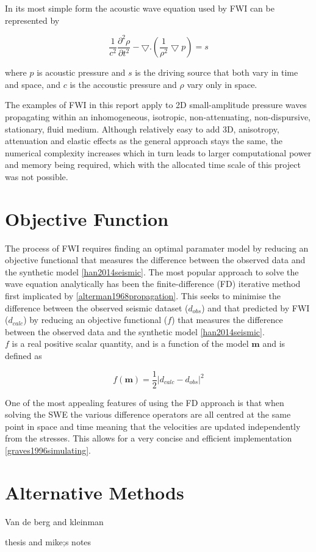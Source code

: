 In its most simple form the acoustic wave equation used by FWI can be represented by 

\begin{equation}
\frac{1}{c^{2}}\frac{\partial  ^{2}\rho }{\partial t^{2}} -\bigtriangledown.\left ( \frac{1}{\rho^{2}} \bigtriangledown p\right ) = s
\label{simple_wave_equation}
\end{equation}

where $p$ is acoustic pressure and $s$ is the driving source that both vary in time and space, and $c$ is the accoustic pressure and $\rho$ vary only in space. 

The examples of FWI in this report apply to 2D small-amplitude pressure waves propagating within an inhomogeneous, isotropic, non-attenuating, non-dispursive, stationary, fluid medium. Although relatively easy to add 3D, anisotropy, attenuation and elastic effects as the general approach stays the same, the numerical complexity increases which in turn leads to larger computational power and memory being required, which with the allocated time scale of this project was not possible. 

\section{Objective Function}
The process of FWI requires finding an optimal paramater model by reducing an objective functional that measures the difference between the observed data and the synthetic model \ref{han2014seismic}.  
The most popular approach to solve the wave equation analytically has been the finite-difference (FD) iterative method first implicated by \ref{alterman1968propagation}. This seeks to minimise the difference between the observed seismic dataset ($d_{obs}$) and that predicted by FWI ($d_{calc}$) by reducing an objective functional ($f$) that measures the difference between the observed data and the synthetic model \ref{han2014seismic}. 
\\ $f$ is a real positive scalar quantity, and is a function of the model $\mathbf{m}$ and is defined as 

\begin{equation}
f(\mathbf{m})= \frac{1}{2}\left | d_{calc}-d_{obs} \right|^{2}
\label{objective_function}
\end{equation}

One of the most appealing features of using the FD approach is that when solving the SWE the various difference operators are all centred at the same point in space and time meaning that the velocities are updated independently from the stresses. This allows for a very concise and efficient implementation \ref{graves1996simulating}. 




\section{Alternative Methods} 
  Van de berg and kleinman 

thesis and mike;s notes 
